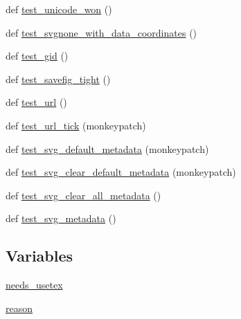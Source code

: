 \begin{DoxyCompactItemize}
\item 
def \hyperlink{namespacematplotlib_1_1tests_1_1test__backend__svg_a766b6b8b167642ec736b97df892f8995}{test\+\_\+unicode\+\_\+won} ()
\item 
def \hyperlink{namespacematplotlib_1_1tests_1_1test__backend__svg_a5e84126f73c2c994f0b41b43796c57db}{test\+\_\+svgnone\+\_\+with\+\_\+data\+\_\+coordinates} ()
\item 
def \hyperlink{namespacematplotlib_1_1tests_1_1test__backend__svg_a2d70268dcf1fd9f131e3a6b3ebcc17b9}{test\+\_\+gid} ()
\item 
def \hyperlink{namespacematplotlib_1_1tests_1_1test__backend__svg_a7962bd8c6f44a4337f6e35f3ab8cd591}{test\+\_\+savefig\+\_\+tight} ()
\item 
def \hyperlink{namespacematplotlib_1_1tests_1_1test__backend__svg_a5f671a92da19bae1cbe69356e4eca59e}{test\+\_\+url} ()
\item 
def \hyperlink{namespacematplotlib_1_1tests_1_1test__backend__svg_a9bf824ce3df78539407343971377a490}{test\+\_\+url\+\_\+tick} (monkeypatch)
\item 
def \hyperlink{namespacematplotlib_1_1tests_1_1test__backend__svg_ae5297a0fc4ce14001fedd769d7a15f45}{test\+\_\+svg\+\_\+default\+\_\+metadata} (monkeypatch)
\item 
def \hyperlink{namespacematplotlib_1_1tests_1_1test__backend__svg_a2a8ddd0f915b12defb7a68f94b14afa8}{test\+\_\+svg\+\_\+clear\+\_\+default\+\_\+metadata} (monkeypatch)
\item 
def \hyperlink{namespacematplotlib_1_1tests_1_1test__backend__svg_a67fb90a15e21a163073bd981e2ae943f}{test\+\_\+svg\+\_\+clear\+\_\+all\+\_\+metadata} ()
\item 
def \hyperlink{namespacematplotlib_1_1tests_1_1test__backend__svg_a5caf073646dfc596ffb06c0ef246a01a}{test\+\_\+svg\+\_\+metadata} ()
\end{DoxyCompactItemize}
\subsection*{Variables}
\begin{DoxyCompactItemize}
\item 
\hyperlink{namespacematplotlib_1_1tests_1_1test__backend__svg_a3ed821ecbe250918b6b6ce483e316d4e}{needs\+\_\+usetex}
\item 
\hyperlink{namespacematplotlib_1_1tests_1_1test__backend__svg_ad6f4142679b638fc202a262e7c24fd65}{reason}
\end{DoxyCompactItemize}


